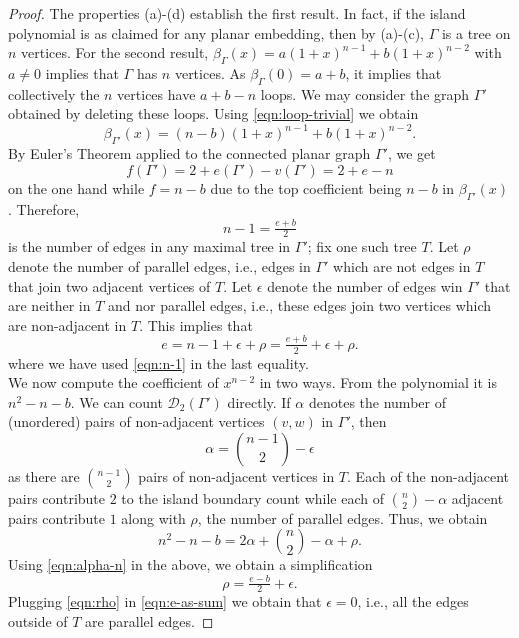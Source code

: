 \documentclass[10pt, reqno]{amsart}
\newcommand{\hf}{\hspace*{0.5cm}}
\theoremstyle{plain}
\theoremstyle{remark}
\theoremstyle{definition}
\numberwithin{equation}{section}
\begin{document}
\begin{proof}
The properties (a)-(d) establish the first result. In fact, if the island polynomial is as claimed for any planar embedding, then by (a)-(c), $\Gamma$ is a tree on $n$ vertices. For the second result, ${\beta}_{\Gamma}(x)=a(1+x)^{n-1}+b(1+x)^{n-2}$ with $a\neq 0$ implies that $\Gamma$ has $n$ vertices. As $\beta_\Gamma(0)=a+b$, it implies that collectively the $n$ vertices have $a+b-n$ loops. We may consider the graph $\Gamma'$ obtained by deleting these loops. Using \eqref{eqn:loop-trivial} we obtain
$$\beta_{\Gamma'}(x)= (n-b)(1+x)^{n-1}+b(1+x)^{n-2}.$$
By Euler's Theorem applied to the connected planar graph $\Gamma'$, we get
$$f(\Gamma')=2+e(\Gamma')-v(\Gamma')=2+e-n$$ 
on the one hand while $f=n-b$ due to the top coefficient being $n-b$ in $\beta_{\Gamma'}(x)$. Therefore,
\begin{equation}\label{eqn:n-1}
n-1=\tfrac{e+b}{2}
\end{equation}
is the number of edges in any maximal tree in $\Gamma'$; fix one such tree $T$. Let $\rho$ denote the number of parallel edges, i.e., edges in $\Gamma'$ which are not edges in $T$ that join two adjacent vertices of $T$. Let $\epsilon$ denote the number of edges win $\Gamma'$ that are neither in $T$ and nor parallel edges, i.e., these edges join two vertices which are non-adjacent in $T$. This implies that
\begin{equation}\label{eqn:e-as-sum}
e=n-1+\epsilon+\rho=\tfrac{e+b}{2}+\epsilon+\rho.
\end{equation}
where we have used \eqref{eqn:n-1} in the last equality.\\
\hf We now compute the coefficient of $x^{n-2}$ in two ways. From the polynomial it is $n^2-n-b$. We can count $\mathscr{D}_2(\Gamma')$ directly. If $\alpha$ denotes the number of (unordered) pairs of non-adjacent vertices $(v,w)$ in $\Gamma'$, then 
\begin{equation}\label{eqn:alpha-n}
\alpha={n-1 \choose 2}-\epsilon
\end{equation}
as there are ${n-1 \choose 2}$ pairs of non-adjacent vertices in $T$. Each of the non-adjacent pairs contribute $2$ to the island boundary count while each of ${n \choose 2}-\alpha$ adjacent pairs contribute $1$ along with $\rho$, the number of parallel edges. Thus, we obtain
\begin{equation*}
n^2-n-b=2\alpha+{n\choose 2}-\alpha+\rho.
\end{equation*}
Using \eqref{eqn:alpha-n} in the above, we obtain a simplification
\begin{equation}\label{eqn:rho}
    \rho=\tfrac{e-b}{2}+\epsilon.
\end{equation}
Plugging \eqref{eqn:rho} in \eqref{eqn:e-as-sum} we obtain that $\epsilon=0$, i.e., all the edges outside of $T$ are parallel edges.
\end{proof}
\end{document}

